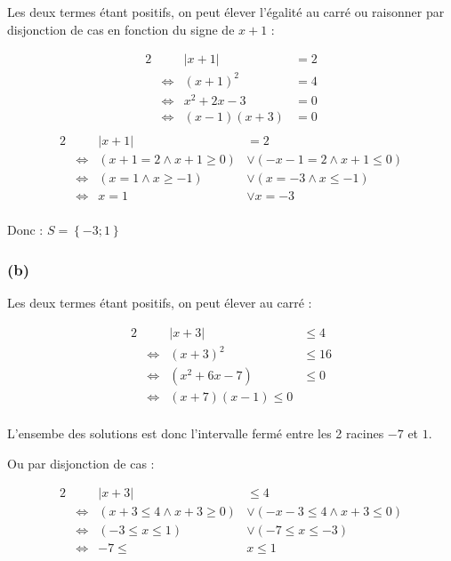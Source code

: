 \documentclass[a4paper,10pt]{report}
\begin{document}
Les deux termes étant positifs, on peut élever l'égalité au carré ou raisonner par disjonction de cas en fonction du signe de $x+1$ :

\begin{alignat*}{2}
	&                    & |x+1| &=2 \\
	&\Longleftrightarrow &(x+1)^2 &= 4 \\
	&\Longleftrightarrow & x^2 +2x -3 &= 0 \\
	&\Longleftrightarrow & (x-1)(x+3) &= 0 \\
\end{alignat*}
\begin{alignat*}{2}
&                    & |x+1| &=2 \\
&\Longleftrightarrow &(x+1=2 \wedge x+1 \geq 0) &\vee (-x-1=2 \wedge x+1 \leq 0) \\
&\Longleftrightarrow &(x=1 \wedge x \geq -1) &\vee (x=-3 \wedge x \leq -1) \\
&\Longleftrightarrow & x=1 &\vee x=-3 \\
\end{alignat*}

Donc : $S=\left\lbrace -3 ; 1 \right\rbrace$

\subsubsection*{(b)}


Les deux termes étant positifs, on peut élever au carré :

\begin{alignat*}{2}
	&                    & |x+3| &\leq 4 \\
	&\Longleftrightarrow &(x+3)^2 &\leq 16 \\
	&\Longleftrightarrow & (x^2 + 6x -7) & \leq 0 \\
	&\Longleftrightarrow & (x+7)(x-1) \leq 0\\
\end{alignat*}

L'ensembe des solutions est donc l'intervalle fermé entre les 2 racines $-7$ et $1$.

Ou par disjonction de cas :

\begin{alignat*}{2}
	&                    & |x+3| &\leq 4 \\
	&\Longleftrightarrow &(x+3\leq 4 \wedge x+3 \geq 0) &\vee (-x-3\leq 4 \wedge x+3 \leq 0) \\
	&\Longleftrightarrow & (-3 \leq x \leq 1) &\vee (-7 \leq x \leq -3) \\
	&\Longleftrightarrow & -7 \leq &x \leq 1 \\
\end{alignat*}
\end{document}

